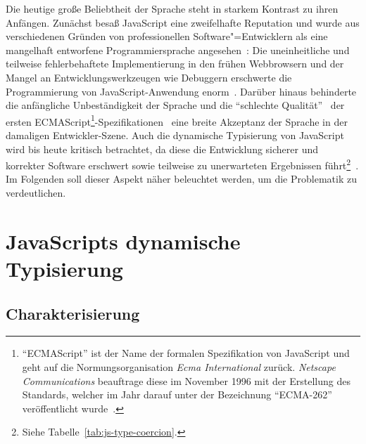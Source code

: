 Die heutige große Beliebtheit der Sprache steht in starkem Kontrast zu ihren Anfängen. Zunächst besaß JavaScript eine zweifelhafte Reputation und wurde aus verschiedenen Gründen von professionellen Software"=Entwicklern als eine mangelhaft entworfene Programmiersprache angesehen~\autocite{CROCKFORD:JS_POPULAR}: Die uneinheitliche und teilweise fehlerbehaftete Implementierung in den frühen Webbrowsern und der Mangel an Entwicklungswerkzeugen wie Debuggern erschwerte die Programmierung von JavaScript-Anwendung enorm~\autocite{OREILLY:JS_HOW_DID_WE_GET_THERE}. Darüber hinaus behinderte die anfängliche Unbeständigkeit der Sprache und die \enquote{schlechte Qualität}~\autocite{CROCKFORD:JS_MISUNDERSTOOD} der ersten ECMAScript\footnote{\enquote{ECMAScript} ist der Name der formalen Spezifikation von JavaScript und geht auf die Normungsorganisation \textit{Ecma International} zurück. \textit{Netscape Communications} beauftrage diese im November 1996 mit der Erstellung des Standards, welcher im Jahr darauf unter der Bezeichnung \enquote{ECMA-262} veröffentlicht wurde~\autocite{ECMASCRIPT:1997}.}-Spezifikationen~\autocite{ECMASCRIPT:1997} eine breite Akzeptanz der Sprache in der damaligen Entwickler-Szene. Auch die dynamische Typisierung von JavaScript wird bis heute kritisch betrachtet, da diese die Entwicklung sicherer und korrekter Software erschwert sowie teilweise
zu unerwarteten Ergebnissen führt\footnote{Siehe Tabelle~\ref{tab:js-type-coercion}.}~\autocite{NIKHIL:2014,PRADEL:2015}. Im Folgenden soll dieser Aspekt näher beleuchtet werden, um die Problematik zu verdeutlichen.

\section{JavaScripts dynamische Typisierung}

\subsection{Charakterisierung}

